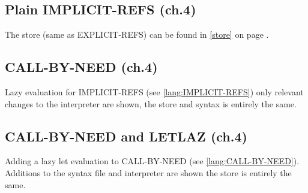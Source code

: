 \documentclass[../codeprint.tex]{subfiles}
\begin{document}
\subsection{Plain IMPLICIT-REFS (ch.4)}
\label{lang:IMPLICIT-REFS}
The store (same as EXPLICIT-REFS) can be found in \autoref{store} on page \pageref{store}.



\subsection{CALL-BY-NEED (ch.4)}
\label{lang:CALL-BY-NEED}
Lazy evaluation for IMPLICIT-REFS (see \autoref{lang:IMPLICIT-REFS}) only relevant changes to the interpreter are shown, the store and syntax is entirely the same.


\subsection{CALL-BY-NEED and LETLAZ (ch.4)}
\label{lang:CALL-BY-NEED-LETLAZ}
Adding a lazy let evaluation to CALL-BY-NEED (see \autoref{lang:CALL-BY-NEED}). Additions to the syntax file and interpreter are shown the store is entirely the same.


\end{document}
